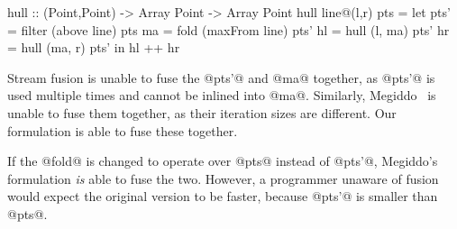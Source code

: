 \begin{code}
hull :: (Point,Point) -> Array Point -> Array Point
hull line@(l,r) pts
 = let pts' = filter (above   line) pts
       ma   = fold   (maxFrom line) pts'
       hl   = hull   (l, ma)        pts'
       hr   = hull   (ma, r)        pts'
   in  hl  ++ hr
\end{code}

Stream fusion is unable to fuse the @pts'@ and @ma@ together, as @pts'@ is used multiple times and cannot be inlined into @ma@.
Similarly, Megiddo~\cite{megiddo1998optimal} is unable to fuse them together, as their iteration sizes are different.
Our formulation is able to fuse these together.

If the @fold@ is changed to operate over @pts@ instead of @pts'@, Megiddo's formulation \emph{is} able to fuse the two.
However, a programmer unaware of fusion would expect the original version to be faster, because @pts'@ is smaller than @pts@.

